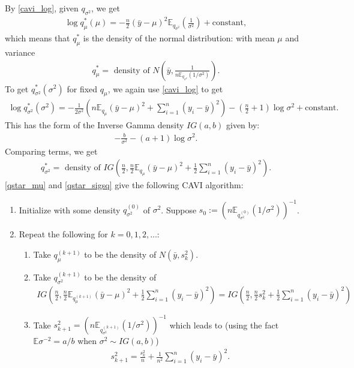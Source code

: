 \documentclass{scrartcl}
\newcommand{\E}{{\mathbb E}}
\begin{document}
By \eqref{cavi_log}, given $q_{\sigma^2}$, we get
\begin{align*}
  \log q^*_{\mu}(\mu) = -\frac{n}{2} (\bar{y} - \mu)^2 \E_{q_{\sigma^2}}
  \left(\frac{1}{\sigma^2} \right) + \text{constant}, 
\end{align*}
which means that $q^*_{\mu}$ is the density of the normal
distribution: 
with mean $\mu$ and variance
\begin{align}\label{qstar_mu}
q^*_{\mu} = \text{ density of } N\left(\bar{y},  \frac{1}{n
  \E_{q_{\sigma^2}}(1/\sigma^2)} \right). 
\end{align}
To get $q^*_{\sigma^2}(\sigma^2)$ for fixed $q_{\mu}$, we again use
\eqref{cavi_log} to get
\begin{align*}
  \log q^*_{\sigma^2}(\sigma^2) = -\frac{1}{2 \sigma^2} \left(n \E_{q_{\mu}}
  (\bar{y} - \mu)^2 + \sum_{i=1}^n (y_i - \bar{y})^2 \right) -
  \left(\frac{n}{2} + 1 \right) \log \sigma^2 + \text{constant}. 
\end{align*}
This has the form of the Inverse Gamma density $IG(a,
b)$ given by:
\begin{align*}
  -\frac{b}{\sigma^2} - (a + 1) \log \sigma^2. 
\end{align*}
Comparing terms, we get
\begin{align}\label{qstar_sigsq}
  q^*_{\sigma^2} = \text{ density of } IG \left(\frac{n}{2}, \frac{n}{2}
  \E_{q_{\mu}} (\bar{y} - \mu)^2 + \frac{1}{2} \sum_{i=1}^n (y_i - \bar{y})^2
  \right). 
\end{align}
\eqref{qstar_mu} and \eqref{qstar_sigsq} give the following CAVI
algorithm:
\begin{enumerate}
\item Initialize with some density $q^{(0)}_{\sigma^2}$ of
  $\sigma^2$. Suppose $s_0 := \left(n
    \E_{q^{(0)}_{\sigma^2}}(1/\sigma^2) \right)^{-1}$.
\item Repeat the following for $k = 0, 1, 2, \dots$:
  \begin{enumerate}
  \item Take $q_{\mu}^{(k+1)}$ to be the density of $N(\bar{y},
    s_k^2)$.
  \item Take $q_{\sigma^2}^{(k+1)}$ to be the density of
    \begin{align*}
      IG \left(\frac{n}{2}, \frac{n}{2}\E_{q^{(k+1)}_{\mu}} (\bar{y} -
      \mu)^2 + \frac{1}{2} \sum_{i=1}^n (y_i - \bar{y})^2 \right) =
      IG \left(\frac{n}{2}, \frac{n}{2}s_k^2 + \frac{1}{2}
      \sum_{i=1}^n (y_i - \bar{y})^2 \right)  
    \end{align*}
  \item Take $s_{k+1}^2 = \left(n \E_{q_{\sigma^2}^{(k+1)}}
      (1/\sigma^2) \right)^{-1}$ which leads to (using the fact
    $\E \sigma^{-2} = a/b$ when $\sigma^2 \sim IG(a, b)$) 
    \begin{align}\label{key_iter}
      s_{k+1}^2 = \frac{s_k^2}{n} + \frac{1}{n^2} \sum_{i=1}^n (y_i -
      \bar{y})^2. 
    \end{align}
  \end{enumerate}
\end{enumerate}
\end{document}
